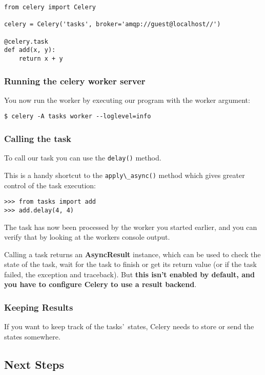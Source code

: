\documentclass[9pt,a4paper]{article}
\begin{document}
\begin{CJK*}{GBK}{kai}
\begin{Verbatim}[frame=single, label=tasks.py]
from celery import Celery

celery = Celery('tasks', broker='amqp://guest@localhost//')

@celery.task
def add(x, y):
    return x + y
\end{Verbatim}

\subsubsection{Running the celery worker server}
You now run the worker by executing our program with the worker argument:

\begin{Verbatim}[frame=single]
$ celery -A tasks worker --loglevel=info
\end{Verbatim}

\subsubsection{Calling the task}
To call our task you can use the \verb"delay()" method.

This is a handy shortcut to the \verb"apply\_async()" method which gives greater control of the task execution:

\begin{Verbatim}[frame=single]
>>> from tasks import add
>>> add.delay(4, 4)
\end{Verbatim}

The task has now been processed by the worker you started earlier, and you can verify that by looking at the workers console output.

Calling a task returns an \textbf{AsyncResult} instance, which can be used to check the state of the task, wait for the task to finish or get its return value (or if the task failed, the exception and traceback). But \textbf{this isn\textquoteright t enabled by default, and you have to configure Celery to use a result backend}.

\subsubsection{Keeping Results}
If you want to keep track of the tasks\textquoteright\ states, Celery needs to store or send the states somewhere.

\subsection{Next Steps}


\end{CJK*}
\end{document}
